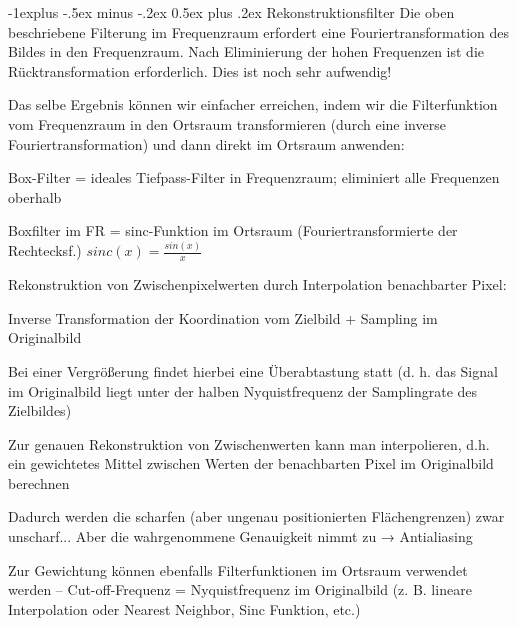 \documentclass[landscape]{article}
\makeatletter
\renewcommand{\subsection}{\@startsection{subsection}{2}{0mm}%
                                {-1explus -.5ex minus -.2ex}%
                                {0.5ex plus .2ex}%
                                {\normalfont\normalsize\bfseries}}
\makeatother
\begin{document}
\begin{multicols}{3}
  \subsection{Rekonstruktionsfilter}
  Die oben beschriebene Filterung im Frequenzraum erfordert eine Fouriertransformation des Bildes in den Frequenzraum. Nach Eliminierung der hohen Frequenzen ist die Rücktransformation erforderlich. Dies ist noch sehr aufwendig!
  
  Das selbe Ergebnis können wir einfacher erreichen, indem wir die Filterfunktion vom Frequenzraum in den Ortsraum transformieren (durch eine inverse Fouriertransformation) und dann direkt im Ortsraum anwenden:
  \begin{itemize*}
    \item Box-Filter = ideales Tiefpass-Filter in Frequenzraum; eliminiert alle Frequenzen oberhalb
    \item Boxfilter im FR = sinc-Funktion im Ortsraum (Fouriertransformierte der Rechtecksf.) $sinc(x)=\frac{sin(x)}{x}$
  \end{itemize*}
  
  Rekonstruktion von Zwischenpixelwerten durch Interpolation benachbarter Pixel:
  \begin{itemize*}
    \item Inverse Transformation der Koordination vom Zielbild + Sampling im Originalbild
    \item Bei einer Vergrößerung findet hierbei eine Überabtastung statt (d. h. das Signal im Originalbild liegt unter der halben Nyquistfrequenz der Samplingrate des Zielbildes)
    \item Zur genauen Rekonstruktion von Zwischenwerten kann man interpolieren, d.h. ein gewichtetes Mittel zwischen Werten der benachbarten Pixel im Originalbild berechnen
    \item Dadurch werden die scharfen (aber ungenau positionierten Flächengrenzen) zwar unscharf... Aber die wahrgenommene Genauigkeit nimmt zu → Antialiasing
    \item Zur Gewichtung können ebenfalls Filterfunktionen im Ortsraum verwendet werden – Cut-off-Frequenz = Nyquistfrequenz im Originalbild (z. B. lineare Interpolation oder Nearest Neighbor, Sinc Funktion, etc.)
  \end{itemize*}
  

\end{multicols}
\end{document}
